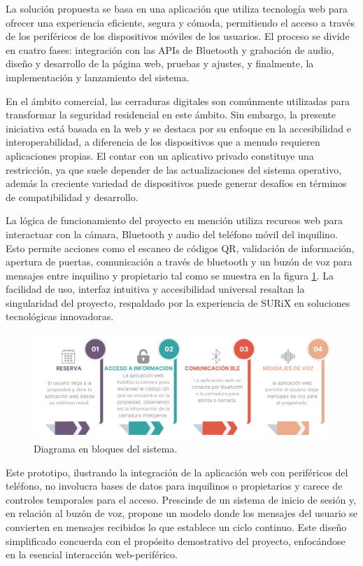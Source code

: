 \documentclass[
11pt, %
codirector, %
]{charter}
\begin{document}
La solución propuesta se basa en una aplicación que utiliza tecnología web para ofrecer una experiencia eficiente, segura y cómoda, permitiendo el acceso a través de los periféricos de los dispositivos móviles de los usuarios. El proceso se divide en cuatro fases: integración con las APIs de Bluetooth y grabación de audio, diseño y desarrollo de la página web, pruebas y ajustes, y finalmente, la implementación y lanzamiento del sistema.

En el ámbito comercial, las cerraduras digitales son comúnmente utilizadas para transformar la seguridad residencial en este ámbito. Sin embargo, la presente iniciativa está basada en la web y se destaca por su enfoque en la accesibilidad e interoperabilidad, a diferencia de los dispositivos que a menudo requieren aplicaciones propias. El contar con un aplicativo privado constituye una restricción, ya que suele depender de las actualizaciones del sistema operativo, además la creciente variedad de dispositivos puede generar desafíos en términos de compatibilidad y desarrollo.

La lógica de funcionamiento del proyecto en mención utiliza recursos web para interactuar con la cámara, Bluetooth y audio del teléfono móvil del inquilino. Esto permite acciones como el escaneo de códigos QR, validación de información, apertura de puertas, comunicación a través de bluetooth y un buzón de voz para mensajes entre inquilino y propietario tal como se muestra en la figura \ref{fig:diagBloques}. La facilidad de uso, interfaz intuitiva y accesibilidad universal resaltan la singularidad del proyecto, respaldado por la experiencia de SURiX en soluciones tecnológicas innovadoras.

\begin{figure}[htpb]
\centering 
\includegraphics[width=1\textwidth]{./Figuras/flowchart.png}
\caption{Diagrama en bloques del sistema.}
\label{fig:diagBloques}
\end{figure}

Este prototipo, ilustrando la integración de la aplicación web con periféricos del teléfono, no involucra bases de datos para inquilinos o propietarios y carece de controles temporales para el acceso. Prescinde de un sistema de inicio de sesión y, en relación al buzón de voz, propone un modelo donde los mensajes del usuario se convierten en mensajes recibidos lo que establece un ciclo continuo. Este diseño simplificado concuerda con el propósito demostrativo del proyecto, enfocándose en la esencial interacción web-periférico.  
\end{document}
